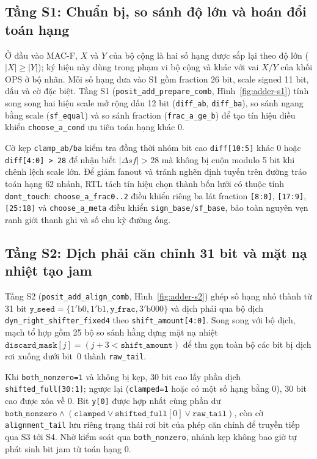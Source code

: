 \subsection{Tầng S1: Chuẩn bị, so sánh độ lớn và hoán đổi toán hạng}

Ở đầu vào MAC-F, $X$ và $Y$ của bộ cộng là hai số hạng được sắp lại theo độ lớn
($|X|\ge|Y|$); ký hiệu này dùng trong phạm vi bộ cộng và khác với vai $X/Y$ của
khối OPS ở bộ nhân. Mỗi số hạng đưa vào S1 gồm fraction 26 bit, scale signed 11 bit,
dấu và cờ đặc biệt. Tầng S1 (\texttt{posit\_add\_prepare\_comb}, Hình~\ref{fig:adder-s1})
tính song song hai hiệu scale mở rộng dấu 12 bit (\texttt{diff\_ab}, \texttt{diff\_ba}),
so sánh ngang bằng scale (\texttt{sf\_equal}) và so sánh fraction (\texttt{frac\_a\_ge\_b})
để tạo tín hiệu điều khiển \texttt{choose\_a\_cond} ưu tiên toán hạng khác 0.

Cờ kẹp \texttt{clamp\_ab/\!ba} kiểm tra đồng thời nhóm bit cao \texttt{diff[10:5]}
khác 0 hoặc \texttt{diff[4:0] > 28} để nhận biết $|\Delta sf|>28$ mà không bị
cuộn modulo 5 bit khi chênh lệch scale lớn. Để giảm fanout và tránh nghẽn định
tuyến trên đường tráo toán hạng $62$ nhánh, RTL tách tín hiệu chọn thành bốn lưới
có thuộc tính \texttt{dont\_touch}: \texttt{choose\_a\_frac0..2} điều khiển riêng
ba lát fraction \texttt{[8:0]}, \texttt{[17:9]}, \texttt{[25:18]} và
\texttt{choose\_a\_meta} điều khiển \texttt{sign\_base}/\texttt{sf\_base}, bảo toàn
nguyên vẹn ranh giới thanh ghi và số chu kỳ đường ống.



\subsection{Tầng S2: Dịch phải căn chỉnh 31 bit và mặt nạ nhiệt tạo jam}

Tầng S2 (\texttt{posit\_add\_align\_comb}, Hình~\ref{fig:adder-s2}) ghép số hạng
nhỏ thành từ 31 bit $\texttt{y\_seed} = \{1'\mathrm{b0}, 1'\mathrm{b1}, \texttt{y\_frac}, 3'\mathrm{b000}\}$
và dịch phải qua bộ dịch \texttt{dyn\_right\_shifter\_fixed4} theo
\texttt{shift\_amount[4:0]}. Song song với bộ dịch, mạch tổ hợp gồm 25 bộ so sánh
hằng dựng mặt nạ nhiệt $\texttt{discard\_mask}[j] = (j + 3 < \texttt{shift\_amount})$
để thu gọn toàn bộ các bit bị dịch rơi xuống dưới bit~0 thành \texttt{raw\_tail}.

Khi \texttt{both\_nonzero=1} và không bị kẹp, 30 bit cao lấy phần dịch
\texttt{shifted\_full[30:1]}; ngược lại (\texttt{clamped=1} hoặc có một số hạng
bằng 0), 30 bit cao được xóa về 0. Bit \texttt{y[0]} được hợp nhất cùng phần dư
$\texttt{both\_nonzero} \land (\texttt{clamped} \lor \texttt{shifted\_full}[0] \lor \texttt{raw\_tail})$,
còn cờ \texttt{alignment\_tail} lưu riêng trạng thái rơi bit của phép căn chỉnh để
truyền tiếp qua S3 tới S4. Nhờ kiểm soát qua \texttt{both\_nonzero}, nhánh kẹp
không bao giờ tự phát sinh bit jam từ toán hạng 0.

